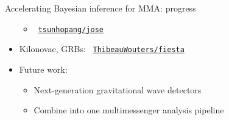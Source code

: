 \documentclass[usenames,dvipsnames,t]{beamer}
\begin{document}
\begin{frame}{Accelerating Bayesian inference for MMA: progress}
\begin{itemize}
\begin{itemize}
      \vspace{\y}
      
      \item \faGithub~\href{https://github.com/tsunhopang/jose}{\texttt{tsunhopang/jose}}
    \end{itemize}

    \pause
    \vspace{\x}

    \item Kilonovae, GRBs: \faGithub~\href{https://github.com/ThibeauWouters/fiesta}{\texttt{ThibeauWouters/fiesta}}

    \pause
    \vspace{\x}

    \item Future work: 
    \vspace{\y}
    \begin{itemize}
      \item Next-generation gravitational wave detectors
      
      \vspace{\y}

      \item Combine into one multimessenger analysis pipeline
    \end{itemize}
  \end{itemize}


\end{frame}
\end{document}

